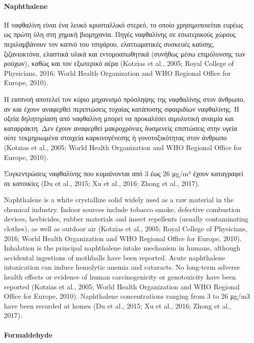 \paragraph{Naphthalene}

Η ναφθαλίνη είναι ένα λευκό κρυσταλλικό στερεό, το οποίο χρησιμοποιείται ευρέως ως πρώτη ύλη στη χημική βιομηχανία. Πηγές ναφθαλίνης σε εσωτερικούς χώρους περιλαμβάνουν τον καπνό του τσιγάρου, ελαττωματικές συσκευές καύσης, ζιζανιοκτόνα, ελαστικά υλικά και εντομοαπωθητικά (συνήθως μέσω επιμόλυνσης των ρούχων), καθώς και τον εξωτερικό αέρα (Kotzias et al., 2005; Royal College of Physicians, 2016; World Health Organization and WHO Regional Office for Europe, 2010).

Η εισπνοή αποτελεί τον κύριο μηχανισμό πρόσληψης της ναφθαλίνης στον άνθρωπο, αν και έχουν αναφερθεί περιπτώσεις τυχαίας κατάποσης σφαιριδίων ναφθαλίνης. Η οξεία δηλητηρίαση από ναφθαλίνη μπορεί να προκαλέσει αιμολυτική αναιμία και καταρράκτη. Δεν έχουν αναφερθεί μακροχρόνιες δυσμενείς επιπτώσεις στην υγεία ούτε τεκμηριωμένα στοιχεία καρκινογένεσης ή γονοτοξικότητας στον άνθρωπο (Kotzias et al., 2005; World Health Organization and WHO Regional Office for Europe, 2010).

Συγκεντρώσεις ναφθαλίνης που κυμαίνονται από 3 έως 26 μg/m³ έχουν καταγραφεί σε κατοικίες (Du et al., 2015; Xu et al., 2016; Zhong et al., 2017).

Naphthalene is a white crystalline solid widely used as a raw material in the chemical industry. Indoor sources include tobacco smoke, defective combustion devices, herbicides, rubber materials and insect repellents (usually contaminating clothes), as well as outdoor air (Kotzias et al., 2005; Royal College of Physicians, 2016; World Health Organization and WHO Regional Office for Europe, 2010). Inhalation is the principal naphthalene intake mechanism in humans, although accidental ingestions of mothballs have been reported. Acute naphthalene intoxication can induce hemolytic anemia and cataracts. No long-term adverse health effects or evidence of human carcinogenicity or genotoxicity have been reported (Kotzias et al., 2005; World Health Organization and WHO Regional Office for Europe, 2010). Naphthalene concentrations ranging from 3 to 26 μg/m3 have been recorded at homes (Du et al., 2015; Xu et al., 2016; Zhong et al., 2017).


\paragraph{Formaldehyde}


